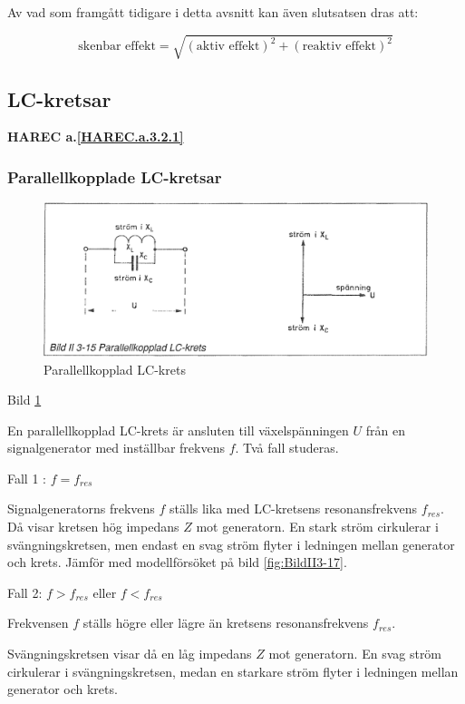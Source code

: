 Av vad som framgått tidigare i detta avsnitt kan även slutsatsen dras att:

\[
\text{skenbar effekt} = \sqrt{(\text{aktiv effekt})^2 + (\text{reaktiv effekt})^2}
\]

\subsection{LC-kretsar}
\textbf{HAREC a.\ref{HAREC.a.3.2.1}\label{myHAREC.a.3.2.1}}

\subsubsection{Parallellkopplade LC-kretsar}

\begin{figure}
\includegraphics[width=\textwidth]{images/bild_2_3-15}
\caption{Parallellkopplad LC-krets}
\label{fig:BildII3-15}
\end{figure}

Bild \ref{fig:BildII3-15}

En parallellkopplad LC-krets är ansluten till växelspänningen \(U\) från en
signalgenerator med inställbar frekvens \(f\). Två fall studeras.

Fall 1 : \(f = f_{res}\)

Signalgeneratorns frekvens \(f\) ställs lika med LC-kretsens resonansfrekvens
\(f_{res}\). Då visar kretsen hög impedans \(Z\) mot generatorn. En stark ström
cirkulerar i svängningskretsen, men endast en svag ström flyter i ledningen
mellan generator och krets. Jämför med modellförsöket på bild \ref{fig:BildII3-17}.

Fall 2: \(f > f_{res}\) eller \(f < f_{res}\)

Frekvensen \(f\) ställs högre eller lägre än kretsens resonansfrekvens
\(f_{res}\).

Svängningskretsen visar då en låg impedans \(Z\) mot generatorn. En svag ström
cirkulerar i svängningskretsen, medan en starkare ström flyter i ledningen
mellan generator och krets.

